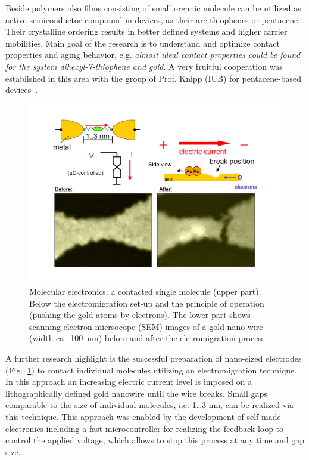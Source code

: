 Beside polymers also films consisting of small organic molecule
can be utilized as active semiconductor compound in devices, as
their are thiophenes or pentacene. Their crystalline ordering
results in better defined systems and higher carrier mobilities.
Main goal of the research is to understand and optimize contact
properties and aging behavior, e.g. {\it almost ideal contact
properties could be found for the system dihexyl-7-thiophene and
gold}. A very fruitful cooperation was established in this area
with the group of Prof. Knipp (IUB) for pentacene-based
devices~\cite{Wagner06-2}.

\begin{figure}[ht]
  \begin{center}
    \includegraphics[width=\hsize]{Wagner/Wagner_2006_Fig2.pdf}
    \caption{Molecular electronics: a contacted single molecule (upper part). Below the
     electromigration set-up and the principle of operation (pushing the gold atoms by electrons).
     The lower part shows scanning electron micrsocope (SEM)
     images of a gold nano wire (width ca.~100~nm) before and
     after the elctromigration process.}
    \label{fig:wagner2}
  \end{center}
\end{figure}

A further research highlight is the successful preparation of
nano-sized electrodes (Fig.~\ref{fig:wagner2}) to contact
individual molecules utilizing an electromigration technique. In
this approach an increasing electric current level is imposed on a
lithographically defined gold nanowire until the wire breaks.
Small gaps comparable to the size of individual molecules, i.e.
1\dots 3 nm, can be realized via this technique. This approach was
enabled by the development of self-made electronics including a
fast microcontroller for realizing the feedback loop to control
the applied voltage, which allows to stop this process at any time
and gap size.


